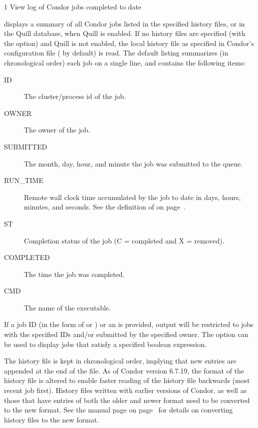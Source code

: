 \begin{ManPage}{\label{man-condor-history}}{1}
{View log of Condor jobs completed to date}
\Synopsis
{}


\Description
{} displays a summary of all Condor jobs listed in the
specified history files, or in the Quill database, when Quill is enabled.
If no history files are specified (with the  option) 
and Quill is not enabled, the local
history file as specified in Condor's configuration file
( by default) is read.  
The default listing summarizes (in chronological order)
each job on a single line, and  contains the following items:


\begin{description}
\item[ID] The cluster/process id of the job. 
\item[OWNER] The owner of the job. 
\item[SUBMITTED] The month, day, hour, and minute the job was submitted to the queue. 
\item[RUN\_TIME] Remote wall clock time accumulated by the job to date in days, hours, minutes, and seconds.  See the definition of
 on page~\pageref{RemoteWallClockTime}.
\item[ST] Completion status of the job (C = completed and X = removed).
\item[COMPLETED] The time the job was completed.
\item[CMD] The name of the executable. 
\end{description}

If a job ID (in the form of  or ) or an
 is provided, output will be restricted to jobs with the
specified IDs and/or submitted by the specified owner.  
The  option can be used to display jobs that satisfy a
specified boolean expression.

The history file is kept in chronological order,
implying that new entries are appended at the end of the
file.
As of Condor version 6.7.19,
the format of the history file is altered to enable faster
reading of the history file backwards (most recent job first).
History files written with earlier versions of Condor,
as well as those that have entries of both
the older and newer format
need to be converted to the new format.
See the  manual page 
on page~\pageref{man-condor-convert-history}
for details on converting history files to the new format.


\end{ManPage}
